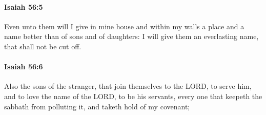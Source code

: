 		\paragraph{Isaiah 56:5} %
			\label{ISAIAH-56-5}

			Even unto them will I give in mine house and within my walls a place and a name better than of sons and of daughters: I will give them an everlasting name, that shall not be cut off.


		\paragraph{Isaiah 56:6} %
			\label{ISAIAH-56-6}

			Also the sons of the stranger, that join themselves to the LORD, to serve him, and to love the name of the LORD, to be his servants, every one that keepeth the sabbath from polluting it, and taketh hold of my covenant;

